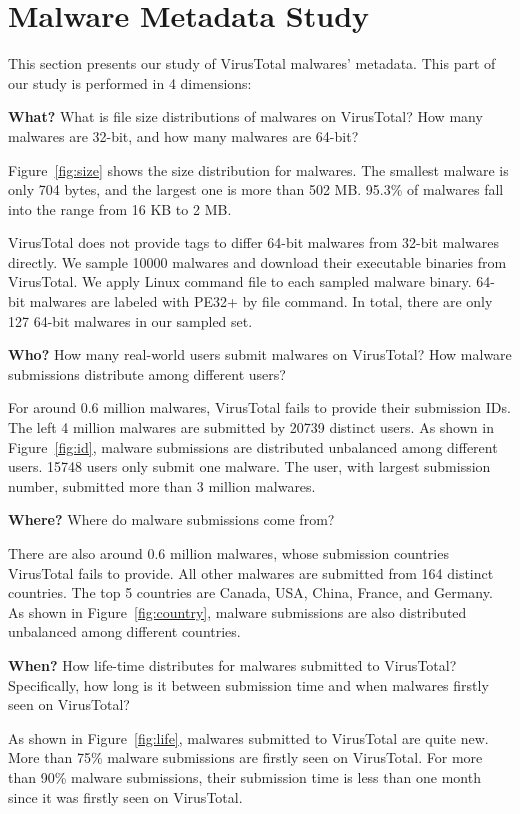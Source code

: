 \section{Malware Metadata Study}
\label{sec:meta}

This section presents our study of VirusTotal malwares’ metadata. 
This part of our study is performed in 4 dimensions:

{\bf What?} What is file size distributions of malwares on VirusTotal? 
How many malwares are 32-bit, and how many malwares are 64-bit? 



Figure~\ref{fig:size} shows the size distribution for malwares. 
The smallest malware is only 704 bytes, and the largest one is more than 502 MB. 
95.3\% of malwares fall into the range from 16 KB to 2 MB. 

VirusTotal does not provide tags to differ 64-bit malwares from 32-bit malwares directly. 
We sample 10000 malwares and download their executable binaries from VirusTotal.
We apply Linux command file to each sampled malware binary. 
64-bit malwares are labeled with PE32+ by file command. 
In total, there are only 127 64-bit malwares in our sampled set. 

{\bf Who?} How many real-world users submit malwares on VirusTotal? 
How malware submissions distribute among different users? 



For around 0.6 million malwares, VirusTotal fails to provide their submission IDs. 
The left 4 million malwares are submitted by 20739 distinct users.
As shown in Figure~\ref{fig:id}, malware submissions are distributed unbalanced among different users.
15748 users only submit one malware. 
The user, with largest submission number, submitted more than 3 million malwares. 

{\bf Where?} Where do malware submissions come from? 



There are also around 0.6 million malwares, 
whose submission countries VirusTotal fails to provide. 
All other malwares are submitted from 164 distinct countries. 
The top 5 countries are Canada, USA, China, France, and Germany. 
As shown in Figure~\ref{fig:country}, 
malware submissions are also distributed unbalanced among different countries. 

{\bf When?} How life-time distributes for malwares submitted to VirusTotal? 
Specifically, how long is it between submission time and when malwares firstly seen on VirusTotal?



As shown in Figure~\ref{fig:life}, malwares submitted to VirusTotal are quite new. 
More than 75\% malware submissions are firstly seen on VirusTotal.
For more than 90\% malware submissions, 
their submission time is less than one month since it was firstly seen on VirusTotal.  